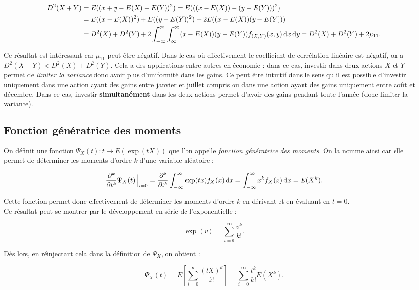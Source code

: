 \documentclass{article}
\begin{document}
			\[\begin{aligned}
				D^2(X+Y) &= E((x+y-E(X)-E(Y))^2) = E(((x-E(X)) + (y-E(Y)))^2) \\
						 &= E((x-E(X))^2) + E((y-E(Y))^2) + 2E((x-E(X))(y-E(Y))) \\
						 &= D^2(X) + D^2(Y) + 2\int_{-\infty}^\infty\int_{\-\infty}^\infty(x-E(X))(y-E(Y))f_{(X, Y)}(x, y)\dif x\dif y = D^2(X) + D^2(Y) + 2\mu_{11}.
			\end{aligned}\]

			Ce résultat est intéressant car $\mu_{11}$ peut être négatif. Dans le cas où effectivement le coefficient de corrélation linéaire est négatif, on a
			$D^2(X+Y) < D^2(X)+D^2(Y)$. Cela a des applications entre autres en économie : dans ce cas, investir dans deux actions $X$ et $Y$ permet de
			\textit{limiter la variance} donc avoir plus d'uniformité dans les gains. Ce peut être intuitif dans le sens qu'il est possible d'investir uniquement dans une
			action ayant des gains entre janvier et juillet compris ou dans une action ayant des gains uniquement entre août et décembre. Dans ce cas, investir
			\textbf{simultanément} dans les deux actions permet d'avoir des gains pendant toute l'année (donc limiter la variance).

	\subsection{Fonction génératrice des moments}
		On définit une fonction $\Psi_X(t) : t \mapsto E(\exp(tX))$ que l'on appelle \textit{fonction génératrice des moments}. On la nomme ainsi car elle permet de déterminer
		les moments d'ordre $k$ d'une variable aléatoire :

		\[\frac {\partial^k}{\partial t^k}\Psi_X(t)\sVert[2] _{t=0} = \frac {\partial^k}{\partial t^k}\int_{-\infty}^\infty\exp(tx)f_X(x)\dif x = \int_{-\infty}^\infty x^kf_X(x)\dif x = E(X^k).\]

		Cette fonction permet donc effectivement de déterminer les moments d'ordre $k$ en dérivant et en évaluant en $t = 0$. \\
		Ce résultat peut se montrer par le développement en série de l'exponentielle :

		\[\exp(v) = \sum_{i=0}^\infty\frac {v^k}{k!}.\]

		Dès lors, en réinjectant cela dans la définition de $\Psi_X$, on obtient :

		\[\Psi_X(t) = E\left[\sum_{i=0}^\infty\frac {(tX)^k}{k!}\right] = \sum_{i=0}^\infty\frac {t^k}{k!}E(X^k).\]
\end{document}
